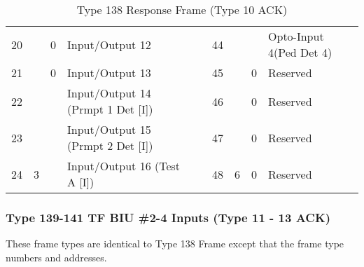 \documentclass[]{article}
\begin{document}
\begin{landscape}
\begin{table}[]
\begin{tabular}{lllllllll}
			20           &                     & 0              & \cellcolor[HTML]{EFEFEF}Input/Output 12 &                    & 44           &                     &                & Opto-Input 4(Ped Det 4)                   \\ \cline{8-9} 
			21           &                     & 0              & \cellcolor[HTML]{EFEFEF}Input/Output 13 &                    & 45           &                     & 0              & Reserved                                  \\ \cline{3-4}
			22           &                     &                & Input/Output 14 (Prmpt 1 Det {[}I{]})   &                    & 46           &                     & 0              & Reserved                                  \\
			23           &                     &                & Input/Output 15 (Prmpt 2 Det {[}I{]})   &                    & 47           &                     & 0              & Reserved                                  \\
			24           & \multirow{-8}{*}{3} &                & Input/Output 16 (Test A {[}I{]})        &                    & 48           & \multirow{-8}{*}{6} & 0              & Reserved                                  \\ \cline{1-4} \cline{6-9} 
		\end{tabular}
		\caption{Type 138 Response Frame (Type 10 ACK)}
		\label{tab:type-138-frame}
	\end{table}
\end{landscape}

\subsubsection {Type 139-141 TF BIU \#2-4 Inputs (Type 11 - 13 ACK)}
These frame types are identical to Type 138 Frame except that the frame type numbers and addresses. 

\clearpage
\end{document}
